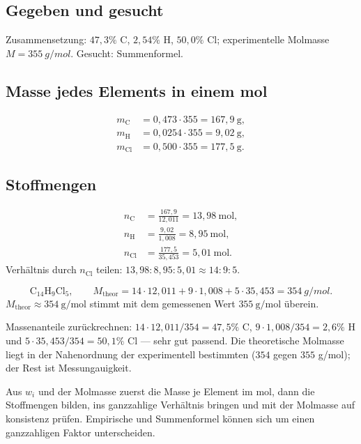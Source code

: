 
\subsection*{Gegeben und gesucht}
Zusammensetzung: $47{,}3\%$ C, $2{,}54\%$ H, $50{,}0\%$ Cl; experimentelle
Molmasse $M = \qty{355}{g/mol}$. Gesucht: Summenformel.

\subsection*{Masse jedes Elements in einem mol}
\begin{align*}
  m_{\mathrm{C}} &= 0{,}473 \cdot 355 = 167{,}9\ \mathrm{g},\\
  m_{\mathrm{H}} &= 0{,}0254 \cdot 355 = 9{,}02\ \mathrm{g},\\
  m_{\mathrm{Cl}} &= 0{,}500 \cdot 355 = 177{,}5\ \mathrm{g}.
\end{align*}

\subsection*{Stoffmengen}
\begin{align*}
  n_{\mathrm{C}} &= \frac{167{,}9}{12{,}011} = 13{,}98\ \mathrm{mol},\\
  n_{\mathrm{H}} &= \frac{9{,}02}{1{,}008} = 8{,}95\ \mathrm{mol},\\
  n_{\mathrm{Cl}} &= \frac{177{,}5}{35{,}453} = 5{,}01\ \mathrm{mol}.
\end{align*}
Verhältnis durch $n_{\mathrm{Cl}}$ teilen: $13{,}98:8{,}95:5{,}01
\approx 14:9:5$.

\begin{ergebnis}
\begin{equation}
  \mathrm{C_{14}H_{9}Cl_{5}},\qquad
  M_{\mathrm{theor}} = 14\cdot12{,}011 + 9\cdot1{,}008
    + 5\cdot35{,}453 = \qty{354}{g/mol}.
\end{equation}
$M_{\mathrm{theor}} \approx 354\ \mathrm{g/mol}$ stimmt mit dem gemessenen Wert
$355\ \mathrm{g/mol}$ überein.
\end{ergebnis}

\begin{kontrolle}
Massenanteile zurückrechnen: $14\cdot12{,}011/354 = 47{,}5\%$ C,
$9\cdot1{,}008/354 = 2{,}6\%$ H und $5\cdot35{,}453/354 = 50{,}1\%$ Cl --- sehr
gut passend. Die theoretische Molmasse liegt in der Nahenordnung der
experimentell bestimmten ($354$ gegen $355$ g/mol); der Rest ist Messungauigkeit.
\end{kontrolle}

\begin{merksatz}
Aus $w_i$ und der Molmasse zuerst die Masse je Element im mol, dann die
Stoffmengen bilden, ins ganzzahlige Verhältnis bringen und mit der Molmasse
auf konsistenz prüfen. Empirische und Summenformel können sich um einen
ganzzahligen Faktor unterscheiden.
\end{merksatz}
